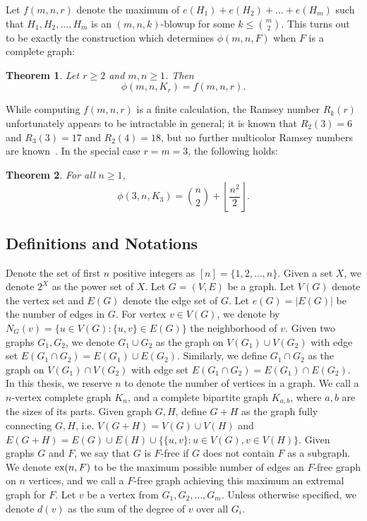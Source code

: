 \documentclass[12pt]{article}
\newtheorem{theorem}{Theorem}
\newcommand*{\ex}{\textnormal{ex}}
\begin{document}
Let $f(m, n, r)$ denote the maximum of $e(H_1) + e(H_2) + \dots + e(H_m)$ such that $H_1, H_2, \dots, H_m$ is an $(m, n, k)$-blowup for some $k \leq \binom{m}{2}$. This turns out to be exactly the construction which determines $\phi(m, n, F)$ when $F$ is a complete graph: 

\begin{theorem}\label{thm:blowup}
Let $r \geq 2$ and $m,n \geq 1$. Then 
\[ 
  \phi(m, n, K_r) = f(m, n, r).
\]
\end{theorem}

While computing $f(m,n,r)$ is a finite calculation, the Ramsey number $R_k(r)$ unfortunately appears to be intractable in general; it is known that $R_2(3) = 6$ and $R_3(3) = 17$ and $R_2(4) = 18$, but no further multicolor Ramsey numbers are known~\cite{ConlonFerber2021,Lefmann1987}. In the special case $r = m = 3$, the following holds: 

\begin{theorem}\label{thm:triangles}
  For all $n \geq 1$,
  \[
    \phi(3, n, K_3) = \binom{n}{2} + \left\lfloor \frac{n^2}{2} \right\rfloor.
  \]
\end{theorem}

\subsection{Definitions and Notations}

Denote the set of first $n$ positive integers as $[n] = \{1, 2, \ldots, n\}$. Given a set $X$, we denote $2^X$ as the power set of $X$. Let $G = (V, E)$ be a graph. Let $V(G)$ denote the vertex set and $E(G)$ denote the edge set of $G$. Let $e(G) = |E(G)|$ be the number of edges in $G$. For vertex $v \in V(G)$, we denote by $N_G(v) = \{u \in V(G) : \{u, v\} \in E(G)\}$ the neighborhood of $v$. Given two graphs $G_1, G_2$, we denote $G_1 \cup G_2$ as the graph on $V(G_1) \cup V(G_2)$ with edge set $E(G_1 \cap G_2) = E(G_1) \cup E(G_2)$. Similarly, we define $G_1 \cap G_2$ as the graph on $V(G_1) \cap V(G_2)$ with edge set $E(G_1 \cap G_2) = E(G_1) \cap E(G_2)$. In this thesis, we reserve $n$ to denote the number of vertices in a graph. We call a $n$-vertex complete graph $K_n$, and a complete bipartite graph $K_{a, b}$, where $a, b$ are the sizes of its parts. Given graph $G, H$, define $G + H$ as the graph fully connecting $G, H$, i.e. $V(G + H) = V(G) \cup V(H)$ and $E(G + H) = E(G) \cup E(H) \cup \{\{u, v\} : u \in V(G), v \in V(H)\}$. Given graphs $G$ and $F$, we say that $G$ is $F$-free if $G$ does not contain $F$ as a subgraph. We denote $\ex(n, F)$ to be the maximum possible number of edges an $F$-free graph on $n$ vertices, and we call a $F$-free graph achieving this maximum an extremal graph for $F$. Let $v$ be a vertex from $G_1, G_2, \ldots, G_m$. Unless otherwise specified, we denote $d(v)$ as the sum of the degree of $v$ over all $G_i$.
\end{document}
